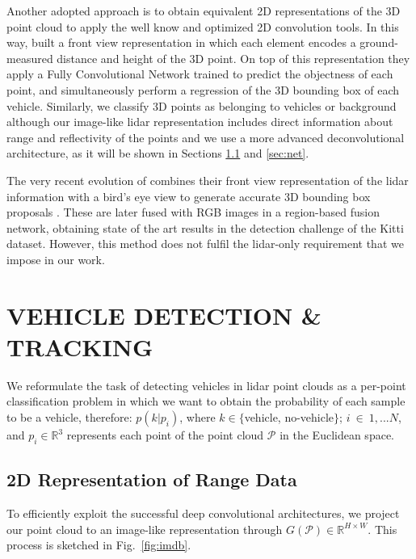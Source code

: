 \documentclass[letterpaper, 10 pt, conference]{ieeeconf}  %
\begin{document}
Another adopted approach is to obtain equivalent 2D representations of the 3D point cloud to apply the well know and optimized 2D convolution tools. In this way, \cite{li2016vehicle} built a front view representation in which each element encodes a ground-measured distance and height of the 3D point. On top of this representation they apply a Fully Convolutional Network trained to predict the objectness of each point, and simultaneously perform a regression of the 3D bounding box of each vehicle. 
Similarly, we classify 3D points as belonging to vehicles or background although our image-like lidar representation includes direct information about range and reflectivity of the points and we use a more advanced deconvolutional architecture, as it will be shown in Sections \ref{sec:2d_data} and \ref{sec:net}.

The very recent evolution of \cite{li2016vehicle} combines their front view representation of the lidar information with a bird's eye view to generate accurate 3D bounding box proposals \cite{chen2016multi}. These are later fused with RGB images in a region-based fusion network, obtaining state of the art results in the detection challenge of the Kitti dataset. However, this method does not fulfil the lidar-only requirement that we impose in our work.


\section{VEHICLE DETECTION \& TRACKING}%
We reformulate the task of detecting vehicles in lidar point clouds as a per-point classification problem in which we want to obtain the probability of each sample to be a vehicle, therefore:
$p(k|p_i)$, where $k \in \{$vehicle, no-vehicle$\}$; $i~\in~1,...N$, and $p_i \in \mathbb{R}^3$ represents each point of the point cloud $\mathcal{P}$ in the Euclidean space. 

\subsection{2D Representation of Range Data}\label{sec:2d_data}%
To efficiently exploit the successful deep convolutional architectures, we project our point cloud to an image-like representation through $G(\mathcal{P}) \in \mathbb{R}^{H \times W}$. This process is sketched in Fig.~\ref{fig:imdb}.
\end{document}
